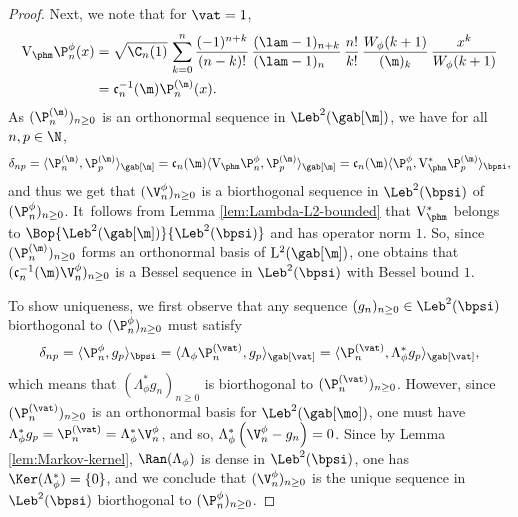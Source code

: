 \begin{proof}
Next, we note that for $\vat =1$,
\begin{align*}
\mathrm{V}_{\phm} \P^{\phi}_n(x) &= \sqrt{\C_n(1)}\, \sum_{k=0}^n \frac{(-1)^{n+k}}{(n-k)!}\, \frac{(\lam-1)_{n+k}}{(\lam-1)_{n\phantom{+k}}}\, \frac{n!}{k!} \,\frac{W_\phi(k+1)}{(\m)_k}\, \frac{x^k}{W_\phi(k+1)}\\
&= \mathfrak{c}^{-1}_n(\m) \P_n^{(\m)}(x).
\end{align*}
As $(\P_n^{(\m)})_{n\geq 0}$ is an orthonormal sequence in $\Leb^2(\gab[\m])$, we have for all $n,p \in \N$,
\begin{equation*}
\delta_{np} =\langle \P_n^{(\m)}, \P_p^{(\m)}\rangle_{\gab[\m]} = \mathfrak{c}_n(\m) \langle \mathrm{V}_{\phm} \P^\phi_n, \P_p^{(\m)}\rangle_{\gab[\m]} = \mathfrak{c}_n(\m) \langle \P^\phi_n, \mathrm{V}_{\phm}^*\P_p^{(\m)}\rangle_{\bpsi},
\end{equation*}
and thus we get that $(\V_n^\phi)_{n \geq 0}$ is a biorthogonal sequence in $\Leb^2(\bpsi)$ of $(\P_n^\phi)_{n \geq 0}$.
It~follows from Lemma \ref{lem:Lambda-L2-bounded} that ${\mathrm{V}_{\phm}^*}$ belongs to
$\Bop{\Leb^2(\gab[\m])}{\Leb^2(\bpsi)}$ and has operator norm $1$. So, since
$(\P_n^{(\m)})_{n \geq 0}$ forms an orthonormal basis of ${\mathrm{L}}^2(\gab[\m])$, one obtains that
$(\mathfrak{c}_n^{-1}(\m)\V_n^\phi)_{n \geq 0}$ is a Bessel sequence in $\Leb^2(\bpsi)$ with Bessel bound $1$.

To show uniqueness, we first observe that any sequence $(g_n)_{n \geq 0} \in \Leb^2(\bpsi)$ biorthogonal to $(\P_n^\phi)_{n \geq 0}$ must satisfy
\begin{equation*}
\delta_{np} = \langle \P_n^\phi, g_p \rangle_\bpsi =
\langle \Lambda_\phi \P_n^{(\vat)}, g_p \rangle_{\gab[\vat]} =
\langle \P_n^{(\vat)}, \Lambda_\phi^* g_p \rangle_{\gab[\vat]},
\end{equation*}
which means that $(\Lambda_\phi^* g_n)_{n \geq 0}$ is biorthogonal to $(\P_n^{(\vat)})_{n \geq 0}$. However, since $(\P_n^{(\vat)})_{n \geq 0}$ is an orthonormal basis for $\Leb^2(\gab[\mo])$, one must have
$\Lambda_\phi^* g_p = \P_n^{(\vat)} = \Lambda_\phi^* \V_n^\phi$,
and so, $\Lambda_\phi^* \left(\V_n^\phi-g_n\right)=0$.
Since by Lemma \ref{lem:Markov-kernel}, $\Ran(\Lambda_\phi)$ is dense in $\Leb^2(\bpsi)$, one has \hbox{$\Ker(\Lambda_\phi^*) = \{0\}$}, and we conclude that $(\V_n^\phi)_{n \geq 0}$ is the unique sequence in $\Leb^2(\bpsi)$ biorthogonal to $(\P_n^\phi)_{n \geq 0}$.


\end{proof}
